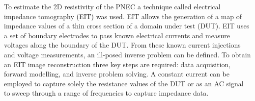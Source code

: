 


To estimate the 2D resistivity of the PNEC a technique called electrical impedance tomography (EIT) was used. EIT allows the generation of a map of impedance values of a thin cross section of a domain under test (DUT). EIT uses a set of boundary electrodes to pass known electrical currents and measure voltages along the boundary of the DUT. From these known current injections and voltage measurements, an ill-posed inverse problem can be defined. To obtain an EIT image reconstruction three key steps are required: data acquisition, forward modelling, and inverse problem solving. A constant current can be employed to capture solely the resistance values of the DUT or as an AC signal to sweep through a range of frequencies to capture impedance data. 

